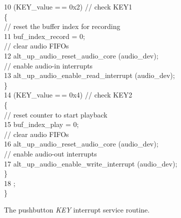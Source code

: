 \documentclass[11pt, twoside, pdftex]{article}
\begin{document}
\begin{figure}[h!]
\begin{center}
\begin{minipage}[t]{12.5 cm}
\begin{tabbing}
10 \> (KEY\_value =$\,$= 0x2)	\>\>// check KEY1\\
\>\>\{\\
\>\>\>// reset the buffer index for recording\\
11 \>\>\>buf\_index\_record = 0;\\
\>\>\>// clear audio FIFOs\\
12 \>\>\>alt\_up\_audio\_reset\_audio\_core (audio\_dev);\\
\>\>\>// enable audio-in interrupts\\
13 \>\>\>alt\_up\_audio\_enable\_read\_interrupt (audio\_dev);\\
\>\>\}\\
14 \> (KEY\_value =$\,$= 0x4) \>\>// check KEY2\\
\>\>\{\\
\>\>\>// reset counter to start playback\\
15 \>\>\>buf\_index\_play = 0;\\
\>\>\>// clear audio FIFOs\\
16 \>\>\>alt\_up\_audio\_reset\_audio\_core (audio\_dev);\\
\>\>\>// enable audio-out interrupts\\
17 \>\>\>alt\_up\_audio\_enable\_write\_interrupt (audio\_dev);\\
\>\>\}\\
18 \>;\\
\>\}
\end{tabbing}
\end{minipage}
\end{center}
	\vspace{-0.33in}\caption{The pushbutton {\it KEY} interrupt service routine.}
   \label{fig:pushbutton_ISR}
\end{figure}
\end{document}
